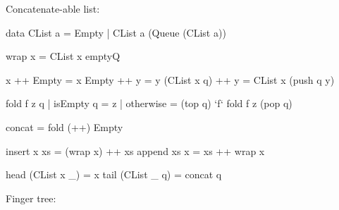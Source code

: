 \documentclass[b5paper]{article}
\begin{document}
Concatenate-able list:

\begin{Haskell}
data CList a = Empty | CList a (Queue (CList a))

wrap x = CList x emptyQ

x ++ Empty = x
Empty ++ y = y
(CList x q) ++ y = CList x (push q y)

fold f z q | isEmpty q = z
           | otherwise = (top q) `f` fold f z (pop q)

concat = fold (++) Empty

insert x xs = (wrap x) ++ xs
append xs x = xs ++ wrap x

head (CList x _) = x
tail (CList _ q) = concat q
\end{Haskell}

Finger tree:
\end{document}
